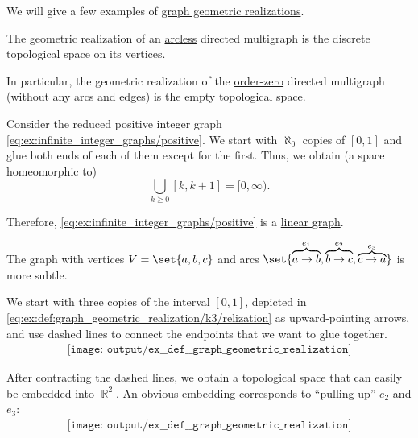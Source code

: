 \begin{example}\label{ex:def:graph_geometric_realization}
  We will give a few examples of \hyperref[def:graph_geometric_realization]{graph geometric realizations}.

  \begin{thmenum}
     The geometric realization of an \hyperref[rem:trivial_graph]{arcless} directed multigraph is the discrete topological space on its vertices.

    In particular, the geometric realization of the \hyperref[rem:trivial_graph]{order-zero} directed multigraph (without any arcs and edges) is the empty topological space.

     Consider the reduced positive integer graph \eqref{eq:ex:infinite_integer_graphs/positive}. We start with \( \aleph_0 \) copies of \( [0, 1] \) and glue both ends of each of them except for the first. Thus, we obtain (a space homeomorphic to)
    \begin{equation*}
      \bigcup_{k \geq 0} [k, k + 1] = [0, \infty).
    \end{equation*}

    Therefore, \eqref{eq:ex:infinite_integer_graphs/positive} is a \hyperref[def:graph_geometric_realization/linear]{linear graph}.

     The graph with vertices \( V = \set{ a, b, c } \) and arcs \( \set{ \overbrace{a \to b}^{e_1}, \overbrace{b \to c}^{e_2}, \overbrace{c \to a}^{e_3} } \) is more subtle.

    We start with three copies of the interval \( [0, 1] \), depicted in \eqref{eq:ex:def:graph_geometric_realization/k3/relization} as upward-pointing arrows, and use dashed lines to connect the endpoints that we want to glue together.
    \begin{equation}\label{eq:ex:def:graph_geometric_realization/k3/relization}
      \begin{aligned}
        \texttt{[image: output/ex\_\_def\_\_graph\_geometric\_realization]}
      \end{aligned}
    \end{equation}

    After contracting the dashed lines, we obtain a topological space that can easily be \hyperref[def:graph_geometric_realization/embedding]{embedded} into \( \BbbR^2 \). An obvious embedding corresponds to \enquote{pulling up} \( e_2 \) and \( e_3 \):
    \begin{equation}\label{eq:ex:def:graph_geometric_realization/k3/embedding}
      \begin{aligned}
        \texttt{[image: output/ex\_\_def\_\_graph\_geometric\_realization]}
      \end{aligned}
    \end{equation}


\end{thmenum}
\end{example}
